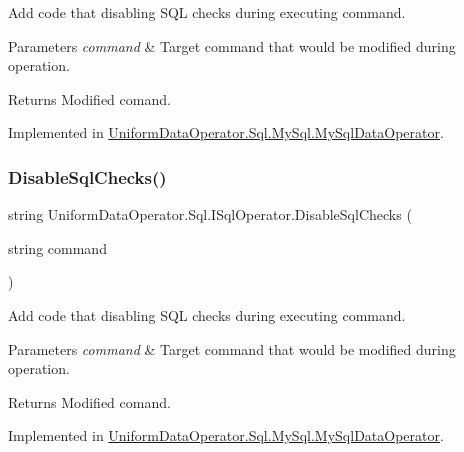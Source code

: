 Add code that disabling S\+QL checks during executing command. 


\begin{DoxyParams}{Parameters}
{\em command} & Target command that would be modified during operation.\\
\hline
\end{DoxyParams}
\begin{DoxyReturn}{Returns}
Modified comand.
\end{DoxyReturn}


Implemented in \mbox{\hyperlink{class_uniform_data_operator_1_1_sql_1_1_my_sql_1_1_my_sql_data_operator_affbacb4fb1773fc14cdbb9cbcd315c5f}{Uniform\+Data\+Operator.\+Sql.\+My\+Sql.\+My\+Sql\+Data\+Operator}}.

\mbox{\label{interface_uniform_data_operator_1_1_sql_1_1_i_sql_operator_a0757f304a24ffaa743e23e8bdd210950}} 
\subsubsection{\texorpdfstring{Disable\+Sql\+Checks()}{DisableSqlChecks()}\hspace{0.1cm}{\footnotesize\ttfamily [2/2]}}
{\footnotesize\ttfamily string Uniform\+Data\+Operator.\+Sql.\+I\+Sql\+Operator.\+Disable\+Sql\+Checks (\begin{DoxyParamCaption}\item[{string}]{command }\end{DoxyParamCaption})}



Add code that disabling S\+QL checks during executing command. 


\begin{DoxyParams}{Parameters}
{\em command} & Target command that would be modified during operation.\\
\hline
\end{DoxyParams}
\begin{DoxyReturn}{Returns}
Modified comand.
\end{DoxyReturn}


Implemented in \mbox{\hyperlink{class_uniform_data_operator_1_1_sql_1_1_my_sql_1_1_my_sql_data_operator_a3e80f9136c9fef46a443901a15f1e289}{Uniform\+Data\+Operator.\+Sql.\+My\+Sql.\+My\+Sql\+Data\+Operator}}.

